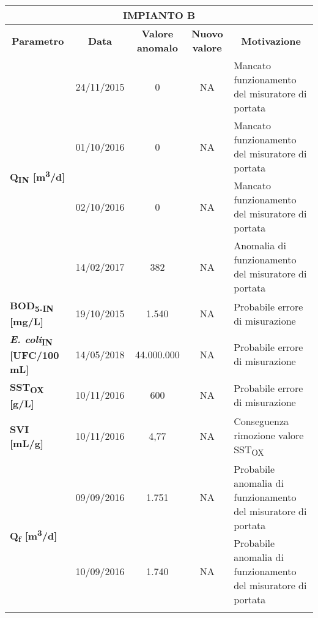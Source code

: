 \begin{sidewaystable}
\begin{center}
\begin{tabular}{|l|c|c|c|l|}
		\multicolumn{5}{|c|}{\textbf{IMPIANTO B}}                                                                                                                                  \\ \hline
		\multicolumn{1}{|c|}{\textbf{Parametro}} & \textbf{Data} & \textbf{Valore anomalo} & \textbf{Nuovo valore} & \multicolumn{1}{c|}{\textbf{Motivazione}}                     \\ \hline
		\multirow{4}{*}{\textbf{Q\textsubscript{IN} {[}m\textsuperscript{3}/d{]}}} & 24/11/2015    & 0                       & NA                    & Mancato funzionamento del misuratore di portata               \\ \cline{2-5} 
		& 01/10/2016    & 0                       & NA                    & Mancato funzionamento del misuratore di portata               \\ \cline{2-5} 
		& 02/10/2016    & 0                       & NA                    & Mancato funzionamento del misuratore di portata               \\ \cline{2-5} 
		& 14/02/2017    & 382                     & NA                    & Anomalia di funzionamento del misuratore di portata           \\ \hline
		\textbf{BOD\textsubscript{5-IN} {[}mg/L{]}}              & 19/10/2015    & 1.540                   & NA                    & Probabile errore di misurazione                               \\ \hline
		\textbf{\textit{E. coli}\textsubscript{IN} {[}UFC/100 mL{]}}      & 14/05/2018    & 44.000.000              & NA                    & Probabile errore di misurazione                               \\ \hline
		\textbf{SST\textsubscript{OX} [g/L]}                           & 10/11/2016    & 600                     & NA                    & Probabile errore di misurazione                               \\ \hline
		\textbf{SVI [mL/g]}                             & 10/11/2016      & 4,77                    & NA                    & Conseguenza rimozione valore SST\textsubscript{OX}                            \\ \hline
		\multirow{3}{*}{\textbf{Q\textsubscript{f} {[}m\textsuperscript{3}/d{]}}}  & 09/09/2016    & 1.751                   & NA                    & Probabile anomalia di funzionamento del misuratore di portata \\ \cline{2-5} 
		& 10/09/2016    & 1.740                   & NA                    & Probabile anomalia di funzionamento del misuratore di portata \\ \cline{2-5} 

\end{tabular}
\end{center}
\end{sidewaystable}
